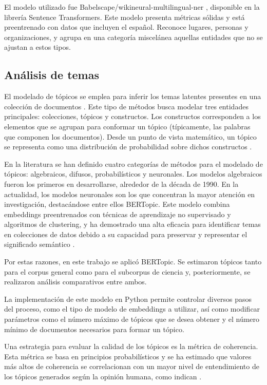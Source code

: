 \documentclass[11pt,a4paper]{article}
\begin{document}
	El modelo utilizado fue Babelscape/wikineural-multilingual-ner \cite{tedeschi-etal-2021-wikineural-combined}, disponible en la librería Sentence Transformers. Este modelo presenta métricas sólidas y está preentrenado con datos que incluyen el español. Reconoce lugares, personas y organizaciones, y agrupa en una categoría miscelánea aquellas entidades que no se ajustan a estos tipos.
	
	\subsection{Análisis de temas}\label{sec:topic_model}
	El modelado de tópicos se emplea para inferir los temas latentes presentes en una colección de documentos \cite{Abdelrazek2023}. Este tipo de métodos busca modelar tres entidades principales: colecciones, tópicos y constructos. Los constructos corresponden a los elementos que se agrupan para conformar un tópico (típicamente, las palabras que componen los documentos). Desde un punto de vista matemático, un tópico se representa como una distribución de probabilidad sobre dichos constructos \cite{Abdelrazek2023}.
	
	En la literatura se han definido cuatro categorías de métodos para el modelado de tópicos: algebraicos, difusos, probabilísticos y neuronales. Los modelos algebraicos fueron los primeros en desarrollarse, alrededor de la década de 1990. En la actualidad, los modelos neuronales son los que concentran la mayor atención en investigación, destacándose entre ellos BERTopic. Este modelo combina embeddings preentrenados con técnicas de aprendizaje no supervisado y algoritmos de clustering, y ha demostrado una alta eficacia para identificar temas en colecciones de datos debido a su capacidad para preservar y representar el significado semántico \cite{Grootendorst2022}.
	
	Por estas razones, en este trabajo se aplicó BERTopic. Se estimaron tópicos tanto para el corpus general como para el subcorpus de ciencia y, posteriormente, se realizaron análisis comparativos entre ambos.
	
	La implementación de este modelo en Python permite controlar diversos pasos del proceso, como el tipo de modelo de embeddings a utilizar, así como modificar parámetros como el número máximo de tópicos que se desea obtener y el número mínimo de documentos necesarios para formar un tópico.
	
	Una estrategia para evaluar la calidad de los tópicos es la métrica de coherencia. Esta métrica se basa en principios probabilísticos y se ha estimado que valores más altos de coherencia se correlacionan con un mayor nivel de entendimiento de los tópicos generados según la opinión humana, como indican \cite{Rder2015}.
	
\end{document}
